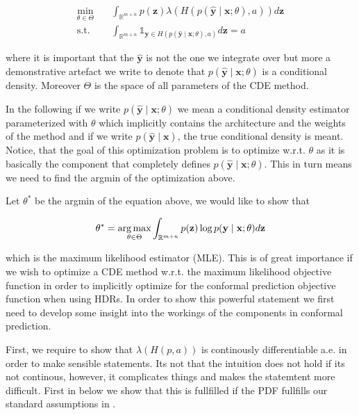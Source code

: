 \begin{align}
    \min_{\theta \in \Theta} \quad & \int_{\mathbb{R}^{m + n}} p(\mathbf{z})
    \lambda(H(p(\mathbf{\hat{y}} \mid \mathbf{x}; \theta), a))
    d\mathbf{z}
    \\
    \text{s.t.} \quad              & \int_{\mathbb{R}^{m + n}}
    \mathds{1}_{\mathbf{y} \in
    H(p(\mathbf{\hat{y}} \mid \mathbf{x}; \theta), a)} d\mathbf{z} = a
\end{align}

where it is important that the $\mathbf{\hat{y}}$ is not the one we integrate over but more a demonstrative artefact we write to denote that $p(\mathbf{\hat{y}} \mid \mathbf{x}; \theta)$ is a conditional density. Moreover $\Theta$ is the space of all parameters of the CDE method.

In the following if we write $p(\mathbf{\hat{y}} \mid \mathbf{x}; \theta)$ we mean a conditional density estimator parameterized with $\theta$ which implicitly contains the architecture and the weights of the method and if we write $p(\mathbf{\hat{y}} \mid \mathbf{x})$, the true conditional density is meant. Notice, that the goal of this optimization problem is to optimize w.r.t. $\theta$ as it is basically the component that completely defines $p(\mathbf{\hat{y}} \mid \mathbf{x}; \theta)$. This in turn means we need to find the argmin of the
optimization above.

Let $\theta^*$ be the argmin of the equation above, we would like to show that

\begin{equation}
    \theta^* = \operatorname*{arg\,max}_{\theta \in \Theta}  \int_{\mathbb{R}^{m + n}}
    p(\mathbf{z}) \log p(\mathbf{y} \mid \mathbf{x}; \theta) d
    \mathbf{z}
\end{equation}

which is the maximum likelihood estimator (MLE). This is of great importance if we wish to optimize a CDE method w.r.t. the maximum likelihood objective function in order to implicitly optimize for the conformal prediction objective function when using HDRs. In order to show this powerful statement we first need to develop some insight into the workings of the components in conformal prediction.

First, we require to show that $\lambda(H(p, a))$ is continously differentiable a.e. in order to make sensible statements. Its not that the intuition does not hold if its not continous, however, it complicates things and makes the statemtent more difficult. First in  below we show that this is fullfilled if the PDF fullfills our standard assumptions in .

